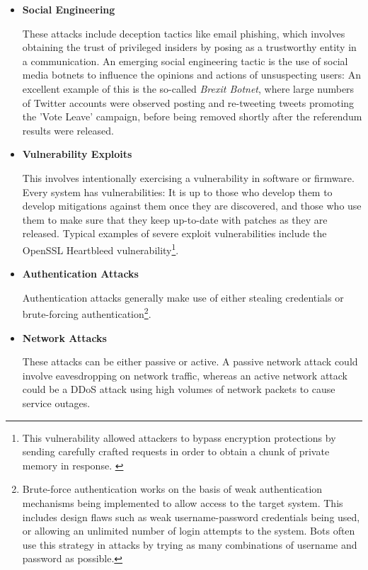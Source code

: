 \begin{itemize}
\item \textbf{Social Engineering}

These attacks include deception tactics like email phishing, which involves obtaining the trust of privileged insiders by posing as a trustworthy entity in a communication. An emerging social engineering tactic is the use of social media botnets to influence the opinions and actions of unsuspecting users: An excellent example of this is the so-called \textit{Brexit Botnet}, where large numbers of Twitter accounts were observed posting and re-tweeting tweets promoting the 'Vote Leave' campaign, before being removed shortly after the referendum results were released. \cite{TheBrexitBotnet}

\item \textbf{Vulnerability Exploits}

This involves intentionally exercising a vulnerability in software or firmware. Every system has vulnerabilities: It is up to those who develop them to develop mitigations against them once they are discovered, and those who use them to make sure that they keep up-to-date with patches as they are released. Typical examples of severe exploit vulnerabilities include the OpenSSL Heartbleed vulnerability\footnote{This vulnerability allowed attackers to bypass encryption protections by sending carefully crafted requests in order to obtain a chunk of private memory in response. \cite{OpenSSLHeartbleed}}.

\item \textbf{Authentication Attacks}

Authentication attacks generally make use of either stealing credentials or brute-forcing authentication\footnote{Brute-force authentication works on the basis of weak authentication mechanisms being implemented to allow access to the target system. This includes design flaws such as weak username-password credentials being used, or allowing an unlimited number of login attempts to the system. Bots often use this strategy in attacks by trying as many combinations of username and password as possible.}. 

\item \textbf{Network Attacks}

These attacks can be either passive or active. A passive network attack could involve eavesdropping on network traffic, whereas an active network attack could be a DDoS attack using high volumes of network packets to cause service outages.
\end{itemize}



